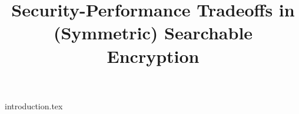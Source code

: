 \documentclass[letterpaper,twocolumn,10pt]{article}
\begin{document}
	
	\title{Security-Performance Tradeoffs in (Symmetric) Searchable Encryption}
	
	\iftoggle{anon}{
		\author{
		\alignauthor
		Anonymous submission
		}
	}{
	\author{Raphael Bost\thanks{Direction Générale de l'Armement - Maîtrise de l'Information \& Université de Rennes 1, France. The views and conclusions contained herein are those of the author and should not be interpreted as necessarily representing the official policies or endorsements, either expressed or implied, of the DGA or the French Government.
	email: \href{mailto:raphael_bost@alumni.brown.edu}{\nolinkurl{raphael_bost@alumni.brown.edu}}
	}
	}
		
	}
	\date{}
	
	\maketitle 
	
	{introduction.tex}
	
	
	
	
\end{document}
